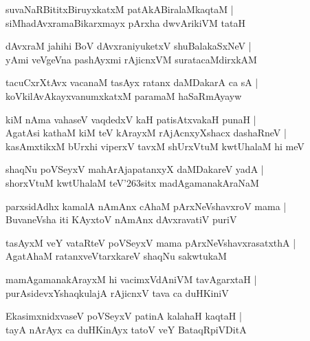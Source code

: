 \begin{shloka}
suvaNaRBititxBiruyxkatxM patAkABiralaMkaqtaM |\\
siMhadAvxramaBikarxmayx pArxha dwvArikiVM tataH
\end{shloka}

\begin{shloka}
dAvxraM ja{hi}hi BoV dAvxraniyuketxV shuBalakaSxNeV |\\
yAmi veVgeVna pashAyxmi rAjicnxVM suratacaMdirxkAM
\end{shloka}

\begin{shloka}
tacuCxrXtAvx vacanaM tasAyx ratanx daMDakarA ca sA |\\
koVkilAvAkayxvanumxkatxM paramaM haSaRmAyayw
\end{shloka}

\begin{shloka}
kiM nAma vahaseV vaqdedxV kaH patisAtxvakaH punaH |\\
AgatAsi kathaM kiM teV kArayxM rAjAcnxyXshacx dashaRneV |\\
kasAmxtikxM bUrxhi viperxV tavxM shUrxVtuM kwtUhalaM hi meV 
\end{shloka}

\begin{shloka}
shaqNu poVSeyxV mahArAjapatanxyX daMDakareV yadA |\\
shorxVtuM kwtUhalaM teV\char'263sitx madAgamanakAraNaM
\end{shloka}

\begin{shloka}
parxsidAdhx kamalA nAmAnx cAhaM pArxNeVshavxroV mama |\\
BuvaneVsha iti KAyxtoV nAmAnx dAvxravatiV puriV
\end{shloka}

\begin{shloka}
tasAyxM veY vataRteV poVSeyxV mama pArxNeVshavxrasatxthA |\\
AgatAhaM ratanxveVtarxkareV shaqNu sakwtukaM
\end{shloka}

\begin{shloka}
mamAgamanakArayxM hi vacimxVdAniVM tavAgarxtaH |\\
purAsidevxYshaqkulajA rAjicnxV tava ca duHKiniV
\end{shloka}

\begin{shloka}
EkasimxnidxvaseV poVSeyxV patinA kalahaH kaqtaH |\\
tayA nArAyx ca duHKinAyx tatoV veY BataqRpiVDitA 
\end{shloka}

